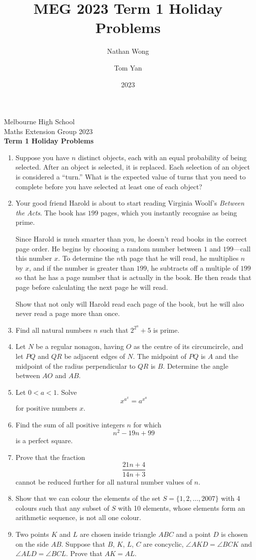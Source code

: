 \documentclass[a4paper]{article}
\title{MEG 2023 Term 1 Holiday Problems}
\author{Nathan Wong\and Tom Yan}
\date{2023}
\begin{document}
\noindent Melbourne High School\\
Maths Extension Group 2023\\
\textbf{Term 1 Holiday Problems}\\

\begin{enumerate}
\item Suppose you have \(n\) distinct
  objects, each with an equal probability of being selected. After
  an object is selected, it is replaced. Each selection of an object
  is considered a ``turn.'' What is the expected value of turns that you
  need to complete before you have selected at least one of each object?

\item Your good friend Harold is about to start reading Virginia Woolf's \emph{Between the Acts}. The book
  has \(199\) pages, which you instantly recognise as being prime.

  Since Harold is much
  smarter than you, he doesn't read books in the correct page order. He begins by choosing a random number
  between \(1\) and \(199\)---call this number \(x\). To determine the \(n\)th
  page that he will read, he multiplies \(n\) by \(x\), and if the number is greater than \(199\), he
  subtracts off a multiple of \(199\) so that he has a page number that is actually in the book. He then reads
  that page before calculating the next page he will read.

  Show that not only will Harold read each page of the book, but he will also never
  read a page more than once. 
  
\item Find all natural numbers $n$ such that $2^{2^n}+5$ is prime. 
\item Let $N$ be a regular nonagon, having $O$ as the centre of its circumcircle, and let $PQ$ and $QR$ be adjacent edges of $N$. The midpoint of $PQ$ is $A$ and the midpoint of the radius perpendicular to $QR$ is $B$. Determine the angle between $AO$ and $AB$.
\item Let $0<a<1$. Solve \[x^{a^x}=a^{x^a}\] for positive numbers $x$.
\item Find the sum of all positive integers \(n\) for which \[n^2-19n+99\] is a perfect square.
\item Prove that the fraction \[\frac{21n+4}{14n+3}\]
  cannot be reduced further for all natural number values of \(n\).
\item Show that we can colour the elements of the set $S=\{1,2,\ldots, 2007\}$ with 4 colours such that any subset of $S$ with 10 elements, whose elements form an arithmetic sequence, is not all one colour.
\item Two points $K$ and $L$ are chosen inside triangle $ABC$ and a point $D$ is chosen on the side $AB$. Suppose that $B$, $K$, $L$, $C$ are concyclic, $\angle AKD = \angle BCK$ and $\angle ALD = \angle BCL$. Prove that $AK = AL$.


\end{enumerate}
\end{document}
